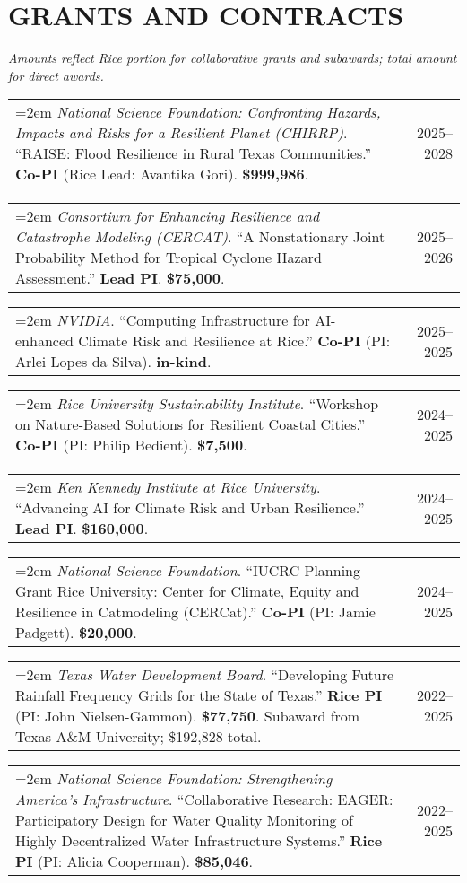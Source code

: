 \documentclass[10pt,oneside]{article}
\makeatletter
\newenvironment{alignedentrieshang}[1][2em]{%
  \noindent%
}{%
}
\newcommand{\hangingitem}[2]{%
  \noindent%
  \begin{tabular*}{\textwidth}{@{}p{0.85\textwidth}@{\extracolsep{\fill}}r@{}}%
    \hangindent=2em \hangafter=1 #1 & #2%
  \end{tabular*}%
}
\makeatother
\begin{document}
\section{GRANTS AND CONTRACTS}

\textit{Amounts reflect Rice portion for collaborative grants and subawards; total amount for direct awards.}

\medskip

\begin{alignedentrieshang}

\hangingitem{\textit{National Science Foundation}\textit{: Confronting Hazards, Impacts and Risks for a Resilient Planet (CHIRRP)}. ``RAISE: Flood Resilience in Rural Texas Communities.'' \textbf{Co-PI} (Rice Lead: Avantika Gori). \textbf{\$999,986}.}{2025--2028}

\hangingitem{\textit{Consortium for Enhancing Resilience and Catastrophe Modeling (CERCAT)}. ``A Nonstationary Joint Probability Method for Tropical Cyclone Hazard Assessment.'' \textbf{Lead PI}. \textbf{\$75,000}.}{2025--2026}

\hangingitem{\textit{NVIDIA}. ``Computing Infrastructure for AI-enhanced Climate Risk and Resilience at Rice.'' \textbf{Co-PI} (PI: Arlei Lopes da Silva). \textbf{in-kind}.}{2025--2025}

\hangingitem{\textit{Rice University Sustainability Institute}. ``Workshop on Nature-Based Solutions for Resilient Coastal Cities.'' \textbf{Co-PI} (PI: Philip Bedient). \textbf{\$7,500}.}{2024--2025}

\hangingitem{\textit{Ken Kennedy Institute at Rice University}. ``Advancing AI for Climate Risk and Urban Resilience.'' \textbf{Lead PI}. \textbf{\$160,000}.}{2024--2025}

\hangingitem{\textit{National Science Foundation}. ``IUCRC Planning Grant Rice University: Center for Climate, Equity and Resilience in Catmodeling (CERCat).'' \textbf{Co-PI} (PI: Jamie Padgett). \textbf{\$20,000}.}{2024--2025}

\hangingitem{\textit{Texas Water Development Board}. ``Developing Future Rainfall Frequency Grids for the State of Texas.'' \textbf{Rice PI} (PI: John Nielsen-Gammon). \textbf{\$77,750}. Subaward from Texas A\&M University; \$192,828 total.}{2022--2025}

\hangingitem{\textit{National Science Foundation}\textit{: Strengthening America's Infrastructure}. ``Collaborative Research: EAGER: Participatory Design for Water Quality Monitoring of Highly Decentralized Water Infrastructure Systems.'' \textbf{Rice PI} (PI: Alicia Cooperman). \textbf{\$85,046}.}{2022--2025}


\end{alignedentrieshang}
\end{document}
